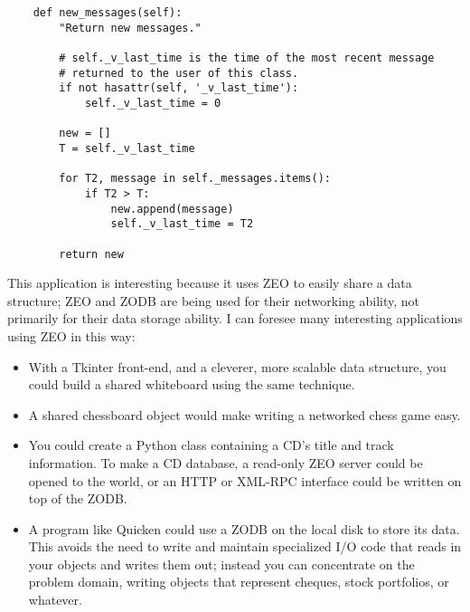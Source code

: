 \begin{verbatim}
    def new_messages(self):
        "Return new messages."

        # self._v_last_time is the time of the most recent message
        # returned to the user of this class. 
        if not hasattr(self, '_v_last_time'):
            self._v_last_time = 0

        new = []
        T = self._v_last_time

        for T2, message in self._messages.items():
            if T2 > T:
                new.append(message)
                self._v_last_time = T2

        return new
\end{verbatim}

This application is interesting because it uses ZEO to easily share a
data structure; ZEO and ZODB are being used for their networking
ability, not primarily for their data storage ability.  I can foresee
many interesting applications using ZEO in this way:

\begin{itemize}
  \item With a Tkinter front-end, and a cleverer, more scalable data
  structure, you could build a shared whiteboard using the same
  technique.

  \item A shared chessboard object would make writing a networked chess
  game easy.  

  \item You could create a Python class containing a CD's title and
  track information.  To make a CD database, a read-only ZEO server
  could be opened to the world, or an HTTP or XML-RPC interface could
  be written on top of the ZODB.

  \item A program like Quicken could use a ZODB on the local disk to
  store its data.  This avoids the need to write and maintain
  specialized I/O code that reads in your objects and writes them out;
  instead you can concentrate on the problem domain, writing objects
  that represent cheques, stock portfolios, or whatever.

\end{itemize}

